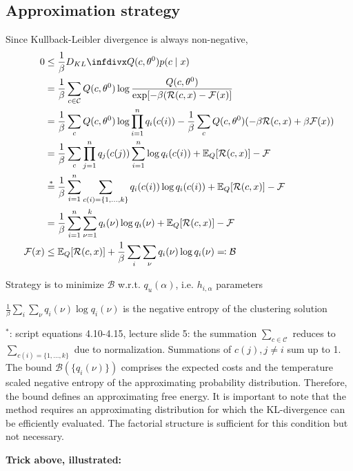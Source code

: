 \documentclass[12pt]{article}
\begin{document}
\subsection{Approximation strategy}
Since Kullback-Leibler divergence is always non-negative,
\begin{equation*}
\begin{split}
0 &\leq \frac{1}{\beta} \dkl{Q(c,\theta^0)}{p(c\given x)} \\
&= \frac{1}{\beta} \sum_{c\in\mathcal{C}} Q(c,\theta^0) \log
\frac{Q(c,\theta^0)}{\exp [-\beta (\mathcal{R}(c,x)-\mathcal{F}(x)]} \\
&= \frac{1}{\beta} \sum_c Q(c,\theta^0) \log \prod_{i=1}^n q_i(c(i)) -
\frac{1}{\beta} \sum_c Q(c,\theta^0) 
(-\beta\mathcal{R}(c,x)+\beta\mathcal{F}(x)) \\
&= \frac{1}{\beta}\sum_c \prod_{j=1}^n q_j(c(j))\sum_{i=1}^n\log q_i(c(i))
+ \E_Q[\mathcal{R}(c,x)] - \mathcal{F} \\
&\stackrel{*}{=} \frac{1}{\beta} \sum_{i=1}^n \sum_{c(i)=\{1,\dots,k\}}
q_i(c(i)) \log q_i(c(i)) + \E_Q[\mathcal{R}(c,x)] - \mathcal{F} \\
&= \frac{1}{\beta} \sum_{i=1}^n \sum_{\nu=1}^k q_i(\nu) \log q_i(\nu) 
+ \E_Q[\mathcal{R}(c,x)] - \mathcal{F} \\
\mathcal{F}(x) &\leq \E_Q[\mathcal{R}(c,x)] + \frac{1}{\beta} 
\sum_i \sum_{\nu} q_i(\nu) \log q_i(\nu) \eqqcolon \mathcal{B}
\end{split}
\end{equation*}
\ulb
\item Strategy is to minimize $\mathcal{B}$ w.r.t. $q_u(\alpha)$, i.e. $h_{i,\alpha}$ parameters
\item $\frac{1}{\beta} \sum_i \sum_{\nu} q_i(\nu) \log q_i(\nu)$ is the negative entropy of the clustering solution
\item $^*$: script equations 4.10-4.15, lecture slide 5: the summation $\sum_{c\in\mathcal{C}}$ reduces to $\sum_{c(i)=\{1,\dots,k\}}$ due to normalization. Summations of $c(j), j\neq i$ sum up to 1.
\ule
The bound $ \mathcal{B}(\{q_i(\nu)\}) $ comprises the expected costs and the temperature scaled negative entropy of the approximating probability distribution. Therefore, the bound defines an approximating free energy. It is important to note that the method requires an approximating distribution for which the KL-divergence can be efficiently evaluated. The factorial structure is sufficient for this condition but not necessary.
\par \textbf{Trick above, illustrated:}
\end{document}
